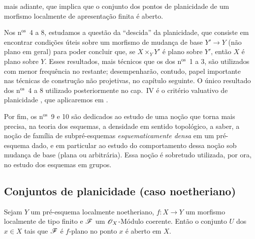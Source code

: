 
mais adiante, que implica que o conjunto dos pontos de planicidade de um morfismo localmente de apresentação finita é aberto.

Nos n$^{\mathrm{os}}$~4 a 8, estudamos a questão da ``descida'' da planicidade, que consiste em encontrar condições úteis sobre um morfismo de mudança de base $Y'\to Y$ (não plano em geral) para poder concluir que, se $X\times_YY'$ é plano sobre $Y'$, então $X$ é plano sobre $Y$.
Esses resultados, mais técnicos que os dos n$^{\mathrm{os}}$~1 a 3, são utilizados com menor frequência no restante; desempenharão, contudo, papel importante nas técnicas de construção não projetivas, no capítulo seguinte.
O único resultado dos n$^{\mathrm{os}}$~4 a 8 utilizado posteriormente no cap.~IV é o critério valuativo de planicidade , que aplicaremos em .

Por fim, os n$^{\mathrm{os}}$~9 e 10 são dedicados ao estudo de uma noção que torna mais precisa, na teoria dos esquemas, a densidade em sentido topológico, a saber, a noção de família de subpré-esquemas \emph{esquematicamente densa} em um pré-esquema dado, e em particular ao estudo do comportamento dessa noção sob mudança de base (plana ou arbitrária).
Essa noção é sobretudo utilizada, por ora, no estudo dos esquemas em grupos.

\subsection{Conjuntos de planicidade (caso noetheriano)}
\label{subsection:IV.11.1}

\begin{theorem}[11.1.1]
\label{IV.11.1.1}
Sejam $Y$ um pré-esquema localmente noetheriano, $f:X\to Y$ um morfismo localmente de tipo finito e $\mathscr{F}$ um $\mathscr{O}_X$-Módulo coerente. Então o conjunto $U$ dos $x\in X$ tais que $\mathscr{F}$ é $f$-plano no ponto $x$ é aberto em $X$.
\end{theorem}

